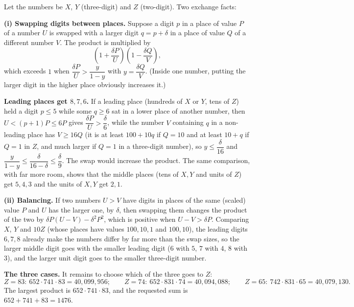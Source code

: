 Let the numbers be $X$, $Y$ (three-digit) and $Z$ (two-digit). Two exchange facts:

\textbf{(i) Swapping digits between places.} Suppose a digit $p$ in a place of value $P$ of a number $U$ is swapped with a larger digit $q=p+\delta$ in a place of value $Q$ of a different number $V$. The product is multiplied by
\[
\left(1+\dfrac{\delta P}{U}\right)\left(1-\dfrac{\delta Q}{V}\right),
\]
which exceeds $1$ when $\dfrac{\delta P}{U}>\dfrac{y}{1-y}$ with $y=\dfrac{\delta Q}{V}$. (Inside one number, putting the larger digit in the higher place obviously increases it.)

\textbf{Leading places get $8,7,6$.} If a leading place (hundreds of $X$ or $Y$, tens of $Z$) held a digit $p\le5$ while some $q\ge6$ sat in a lower place of another number, then $U<(p+1)P\le6P$ gives $\dfrac{\delta P}{U}>\dfrac{\delta}{6}$, while the number $V$ containing $q$ in a non-leading place has $V\ge16Q$ (it is at least $100+10q$ if $Q=10$ and at least $10+q$ if $Q=1$ in $Z$, and much larger if $Q=1$ in a three-digit number), so $y\le\dfrac{\delta}{16}$ and $\dfrac{y}{1-y}\le\dfrac{\delta}{16-\delta}\le\dfrac{\delta}{9}$. The swap would increase the product. The same comparison, with far more room, shows that the middle places (tens of $X,Y$ and units of $Z$) get $5,4,3$ and the units of $X,Y$ get $2,1$.

\textbf{(ii) Balancing.} If two numbers $U>V$ have digits in places of the same (scaled) value $P$ and $U$ has the larger one, by $\delta$, then swapping them changes the product of the two by $\delta P(U-V)-\delta^2P^2$, which is positive when $U-V>\delta P$. Comparing $X$, $Y$ and $10Z$ (whose places have values $100,10,1$ and $100,10$), the leading digits $6,7,8$ already make the numbers differ by far more than the swap sizes, so the larger middle digit goes with the smaller leading digit ($6$ with $5$, $7$ with $4$, $8$ with $3$), and the larger unit digit goes to the smaller three-digit number.

\textbf{The three cases.} It remains to choose which of the three goes to $Z$:
\[
Z=83:\ 652\cdot741\cdot83=40{,}099{,}956;\qquad Z=74:\ 652\cdot831\cdot74=40{,}094{,}088;\qquad Z=65:\ 742\cdot831\cdot65=40{,}079{,}130 .
\]
The largest product is $652\cdot741\cdot83$, and the requested sum is $652+741+83=\boxed{1476}$.
